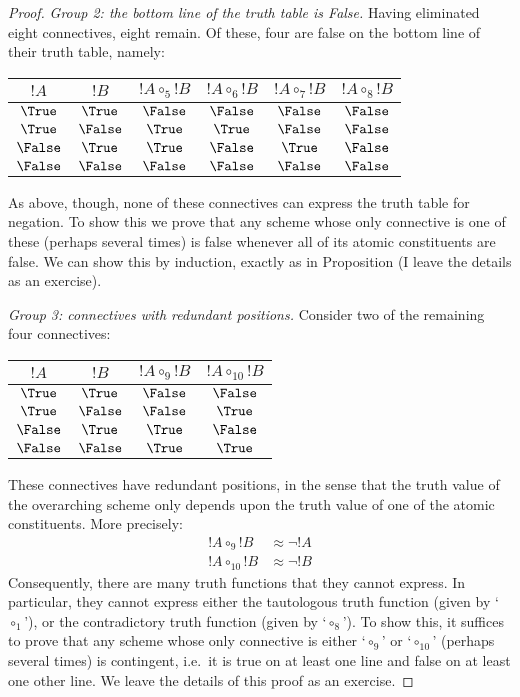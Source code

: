 \documentclass[../../../include/open-logic-section]{subfiles}
\begin{document}
\begin{thm}
\begin{proof}
			\emph{Group 2: the bottom line of the truth table is False.} Having eliminated eight connectives, eight remain. Of these, four are false on the bottom line of their truth table, namely:
	\begin{center}
		\begin{tabular}{c c | c c c c}
		${!A}$ & ${!B}$ & ${!A} \mathrel{\circ_5} {!B}$ & ${!A} \mathrel{\circ_6} {!B}$ & ${!A} \mathrel{\circ_7} {!B}$ & ${!A} \mathrel{\circ_8} {!B}$\\
		\hline
			 $\True$  & $\True$  & $\False$ & $\False$ & $\False$ & $\False$ \\
			 $\True$  & $\False$ & $\True$  & $\True$  & $\False$ & $\False$ \\
			 $\False$ & $\True$  & $\True$  & $\False$ & $\True$  & $\False$ \\
			 $\False$ & $\False$ & $\False$ & $\False$ & $\False$ & $\False$ 
	\end{tabular}
	\end{center}
	As above, though, none of these connectives can express the truth table for negation. To show this we prove that any scheme whose only connective is one of these (perhaps several times) is false whenever all of its atomic constituents are false. We can show this by induction, exactly as in Proposition  (I leave the details as an exercise).
		
		\emph{Group 3: connectives with redundant positions.} 
		Consider two of the remaining four connectives:
		
	\begin{center}
		\begin{tabular}{c c | c c}
		${!A}$ & ${!B}$ & ${!A} \mathrel{\circ_9} {!B}$ & ${!A} \mathrel{\circ_{10}} {!B}$\\
		\hline
			 $\True$  & $\True$  & $\False$ & $\False$ \\
			 $\True$  & $\False$ & $\False$ & $\True$  \\
			 $\False$ & $\True$  & $\True$  & $\False$ \\
			 $\False$ & $\False$ & $\True$  & $\True$  
	\end{tabular}
	\end{center}
	These connectives have redundant positions, in the sense that the truth value of the overarching scheme only depends upon the truth value of one of the atomic constituents. More precisely:
		\begin{align*}
		 	{!A} \circ_9 {!B} &\approx \lnot {!A}\\
			{!A} \circ_{10} {!B} &\approx \lnot {!B}
		\end{align*}
		Consequently, there are many truth functions that they cannot express. In particular, they cannot express either the tautologous truth function (given by `$\circ_1$'), or the contradictory truth function (given by `$\circ_8$'). To show this, it suffices to prove that any scheme whose only connective is either `$\circ_9$' or `$\circ_{10}$' (perhaps several times) is contingent, i.e.\ it is true on at least one line and false on at least one other line. We leave the details of this proof as an exercise.
		

\end{proof}
\end{thm}
\end{document}

